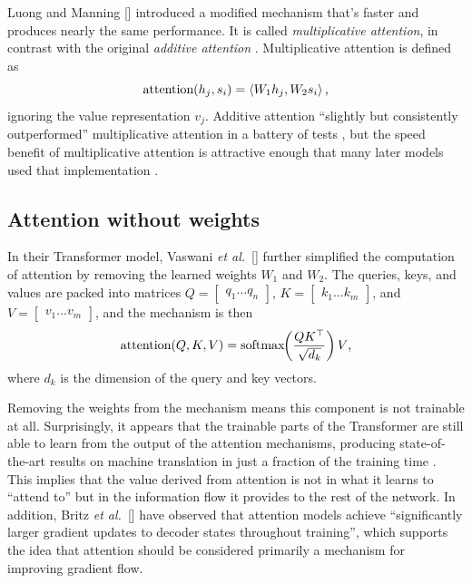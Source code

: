 \documentclass{article}
\newcommand{\etal}{\textit{et al.}}
\begin{document}
Luong and Manning [\citeyear{multiplicative_attn}] introduced a modified mechanism that's faster and produces nearly the same performance. It is called \textit{multiplicative attention}, in contrast with the original \textit{additive attention} \cite{massive_exploration}. Multiplicative attention is defined as
\[
\text{attention}(h_j,s_i)=\left<W_1h_j,W_2s_i\right>\text,
\]
ignoring the value representation $v_j$. Additive attention ``slightly but consistently outperformed'' multiplicative attention in a battery of tests \cite{massive_exploration}, but the speed benefit of multiplicative attention is attractive enough that many later models used that implementation \cite{attn_all_you_need,more_multiplicative}.

\subsection{Attention without weights}

In their Transformer model, Vaswani \etal~[\citeyear{attn_all_you_need}] further simplified the computation of attention by removing the learned weights $W_1$ and $W_2$. The queries, keys, and values are packed into matrices $Q=\begin{bmatrix} q_1 \hdots q_n \end{bmatrix}$, $K=\begin{bmatrix} k_1 \hdots k_m \end{bmatrix}$, and $V=\begin{bmatrix} v_1 \hdots v_m \end{bmatrix}$, and the mechanism is then
\[
\text{attention}(Q,K,V)=\text{softmax}\hspace{-0.6ex}\left(\frac{QK^\top}{\sqrt{d_k}}\right)V\text,
\]
where $d_k$ is the dimension of the query and key vectors.

Removing the weights from the mechanism means this component is not trainable at all. Surprisingly, it appears that the trainable parts of the Transformer are still able to learn from the output of the attention mechanisms, producing state-of-the-art results on machine translation in just a fraction of the training time \cite{attn_all_you_need}. This implies that the value derived from attention is not in what it learns to ``attend to'' but in the information flow it provides to the rest of the network. In addition, Britz \etal~[\citeyear{massive_exploration}] have observed that attention models achieve ``significantly larger gradient updates to decoder states throughout training'', which supports the idea that attention should be considered primarily a mechanism for improving gradient flow.
\end{document}
